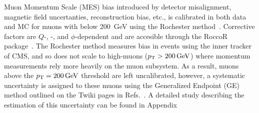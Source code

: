 Muon Momentum Scale (MES) bias introduced by detector misalignment, magnetic field uncertanties, reconstruction bias, etc., is calibrated in both data and MC for muons with \pt below \SI{200}{\GeV} using the Rochester method~\cite{Rochester}. Corrective factors are $Q$-, \pseudorap-, and $\phi$-dependent and are accesible through the RoccoR package~\cite{RoccoR}. The Rochester method measures bias in \HepProcess{\PZ \to \Pmu\Pmu} events using the inner tracker of CMS, and so does not scale to high-\pt muons ($\pt > \SI{200}{\GeV}$) where momentum measurements rely more heavily on the muon subsystem. As a result, muons above the $\pt = \SI{200}{\GeV}$ threshold are left uncalibrated, however, a systematic uncertainty is assigned to these muons using the Generalized Endpoint (GE) method outlined on the Twiki pages in Refs.~\cite{MuonTwiki2016,MuonTwiki2017,MuonTwiki2018}. A detailed study describing the estimation of this uncertainty can be found in Appendix~%
